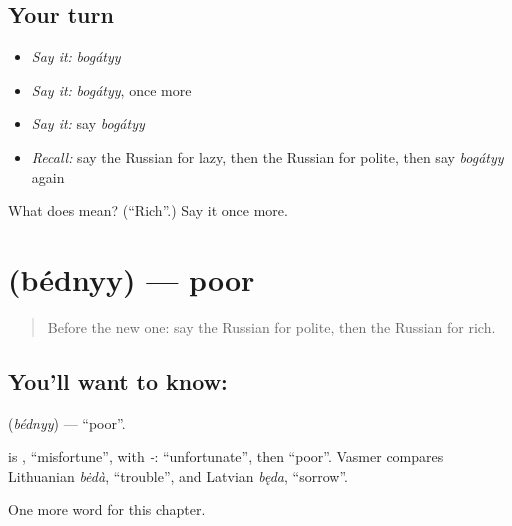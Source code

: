 \subsection*{Your turn}
\begin{itemize}
\raggedright
  \item \emph{Say it:} \emph{bogátyy}
  \item \emph{Say it:} \emph{bogátyy}, once more
  \item \emph{Say it:} say \emph{bogátyy}
  \item \emph{Recall:} say the Russian for lazy, then the Russian for polite, then say \emph{bogátyy} again
\end{itemize}

\begin{tcolorbox}[breakable,colback=teal!4,colframe=teal!35!black,title={Before you move on}]
What does  mean? (\textquotedblleft{}Rich\textquotedblright{}.) Say it once more.
\end{tcolorbox}
\section[\texorpdfstring{\ru{бедный} (bédnyy)}{бедный (bédnyy)}]{ (bédnyy) — poor}

\label{lesson:RU-C156-bednyy}



\begin{quote}
Before the new one: say the Russian for polite, then the Russian for rich.
\end{quote}

\subsection*{You'll want to know: }
\textbf{} (\emph{bédnyy}) — \textquotedblleft{}poor\textquotedblright{}.

\begin{cousinweb}
\textbf{} is \emph{}, \textquotedblleft{}misfortune\textquotedblright{}, with \emph{-}: \textquotedblleft{}unfortunate\textquotedblright{}, then \textquotedblleft{}poor\textquotedblright{}. Vasmer compares Lithuanian \emph{bėdà}, \textquotedblleft{}trouble\textquotedblright{}, and Latvian \emph{będa}, \textquotedblleft{}sorrow\textquotedblright{}.
\end{cousinweb}

\begin{grammarlens}[title={What you've built}]
One more word for this chapter.
\end{grammarlens}

